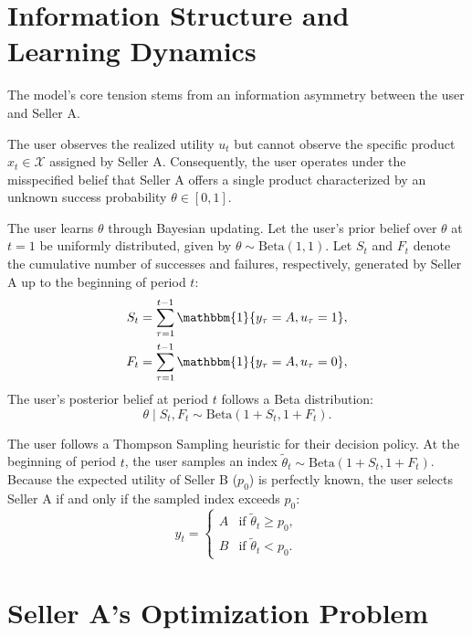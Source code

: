 \documentclass[opre]{informs3} %
\newcommand{\Ind}[1]{\mathbbm{1}\{#1\}}
\begin{document}
\section{Information Structure and Learning Dynamics}

The model's core tension stems from an information asymmetry between the user and Seller A. 

\begin{assumption}
The user observes the realized utility $u_t$ but cannot observe the specific product $x_t \in \mathcal{X}$ assigned by Seller A. Consequently, the user operates under the misspecified belief that Seller A offers a single product characterized by an unknown success probability $\theta \in [0, 1]$.
\end{assumption}

The user learns $\theta$ through Bayesian updating. Let the user's prior belief over $\theta$ at $t=1$ be uniformly distributed, given by $\theta \sim \text{Beta}(1, 1)$. Let $S_t$ and $F_t$ denote the cumulative number of successes and failures, respectively, generated by Seller A up to the beginning of period $t$:
\begin{align}
    S_t &= \sum_{\tau=1}^{t-1} \Ind{y_\tau = A, u_\tau = 1}, \\
    F_t &= \sum_{\tau=1}^{t-1} \Ind{y_\tau = A, u_\tau = 0},
\end{align}
The user's posterior belief at period $t$ follows a Beta distribution:
\begin{equation}
    \theta \mid S_t, F_t \sim \text{Beta}(1 + S_t, 1 + F_t).
\end{equation}

The user follows a Thompson Sampling heuristic for their decision policy. At the beginning of period $t$, the user samples an index $\tilde{\theta}_t \sim \text{Beta}(1 + S_t, 1 + F_t)$. Because the expected utility of Seller B ($p_0$) is perfectly known, the user selects Seller A if and only if the sampled index exceeds $p_0$:
\begin{equation}
    y_t = 
    \begin{cases} 
      A & \text{if } \tilde{\theta}_t \geq p_0, \\ 
      B & \text{if } \tilde{\theta}_t < p_0.
    \end{cases}
\end{equation}

\section{Seller A's Optimization Problem}
\end{document}
